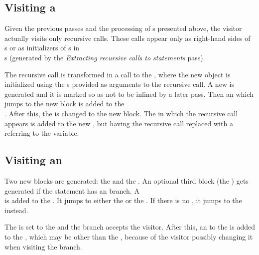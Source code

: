 \subsection{Visiting a }

Given the previous passes and the processing of s presented above, the visitor actually visits only
recursive calls. These calls appear only as right-hand sides of\\
s or as initializers of s in\\
s (generated by the \textit{Extracting recursive calls to statements} pass).

The recursive call is transformed in a  call to the , where the new  object is
initialized using the s provided as arguments to the recursive call. A new  is generated
and it is marked so as not to be inlined by a later pass. Then an  which jumps to the
new block is added to the\\
. After this, the  is changed to the new block. The
 in which the recursive call appears is added to the new , but having the
recursive call replaced with a  referring to the  variable.

\subsection{Visiting an }

Two new blocks are generated: the  and the . An optional third block (the
) gets generated if the  statement has an  branch. A\\
 is added to the . It jumps to either the  or the
. If there is no , it jumps to the  instead.

The  is set to the  and the  branch accepts the visitor. After this,
an  to the  is added to the , which may be other
than the , because of the visitor possibly changing it when visiting the  branch.

